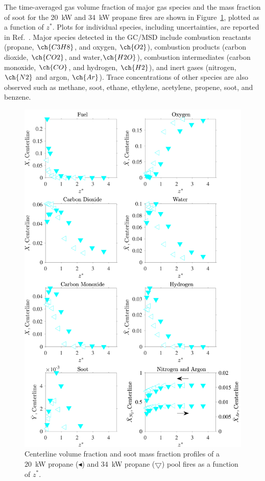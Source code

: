 \documentclass[12pt]{ussci}
\begin{document}
The time-averaged gas volume fraction of major gas species and the mass fraction of soot for the 20~kW and 34~kW propane fires are shown in Figure~\ref{fig:Fuel_Comparison}, plotted as a function of $z^*$. Plots for individual species, including uncertainties, are reported in Ref.~\cite{}. Major species detected in the GC/MSD include combustion reactants (propane, $\ch{C3H8}$, and oxygen, $\ch{O2}$), combustion products (carbon dioxide, $\ch{CO2}$, and water,$\ch{H2O}$), combustion intermediates (carbon monoxide, $\ch{CO}$, and hydrogen, $\ch{H2}$), and inert gases (nitrogen, $\ch{N2}$ and argon, $\ch{Ar}$). Trace concentrations of other species are also observed such as methane, soot, ethane, ethylene, acetylene, propene, soot, and benzene. 
\begin{figure}[!]
	\centering
\includegraphics[width=12.5cm,keepaspectratio]{OVERALL_Fuel_Comparison.pdf}
	\caption[Centerline volume fraction and soot mass fraction profiles]{Centerline volume fraction and soot mass fraction profiles of a 20~kW propane ($\blacktriangleleft$) and 34~kW propane ($\bigtriangledown$) pool fires as a function of $z^*$.}
	\label{fig:Fuel_Comparison}
\end{figure}
\end{document}
